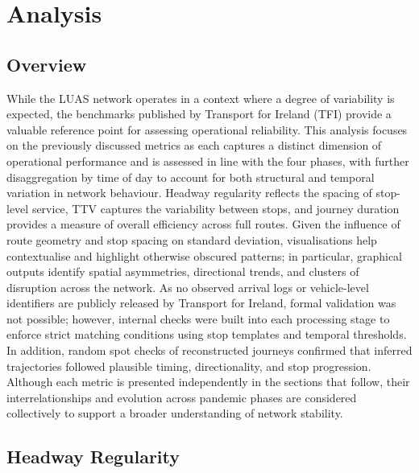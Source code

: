 \section*{Analysis}

\subsection*{Overview}

    While the LUAS network operates in a context where a degree of variability is expected, the benchmarks published by Transport for Ireland (TFI) provide a valuable reference point for assessing operational reliability. This analysis focuses on the previously discussed metrics as each captures a distinct dimension of operational performance and is assessed in line with the four phases, with further disaggregation by time of day to account for both structural and temporal variation in network behaviour. Headway regularity reflects the spacing of stop-level service, TTV captures the variability between stops, and journey duration provides a measure of overall efficiency across full routes. Given the influence of route geometry and stop spacing on standard deviation, visualisations help contextualise and highlight otherwise obscured patterns; in particular, graphical outputs identify spatial asymmetries, directional trends, and clusters of disruption across the network. As no observed arrival logs or vehicle-level identifiers are publicly released by Transport for Ireland, formal validation was not possible; however, internal checks were built into each processing stage to enforce strict matching conditions using stop templates and temporal thresholds. In addition, random spot checks of reconstructed journeys confirmed that inferred trajectories followed plausible timing, directionality, and stop progression. Although each metric is presented independently in the sections that follow, their interrelationships and evolution across pandemic phases are considered collectively to support a broader understanding of network stability.

\subsection*{Headway Regularity}

